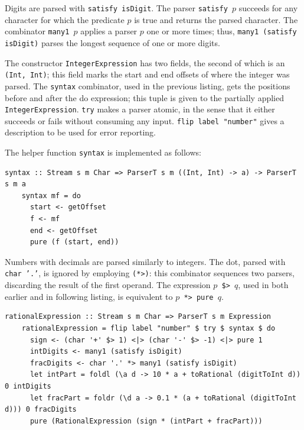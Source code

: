 \documentclass[UdineBachThesis,american,11pt]{PhdThesis}
\begin{document}
  Digits are parsed with \mbox{\texttt{satisfy isDigit}}. The parser
  \mbox{\texttt{satisfy $p$}} succeeds for any character for which the predicate
  $p$ is true and returns the parsed character. The combinator
  \mbox{\texttt{many1 $p$}} applies a parser $p$ one or more times; thus,
  \mbox{\texttt{many1 (satisfy isDigit)}} parses the longest sequence of one or
  more digits.

  The constructor \mbox{\texttt{IntegerExpression}} has two fields, the second
  of which is an \mbox{\texttt{(Int, Int)}}; this field marks the start and end
  offsets of where the integer was parsed. The \mbox{\texttt{syntax}}
  combinator, used in the previous listing, gets the positions before and after
  the do expression; this tuple is given to the partially applied
  \mbox{\texttt{IntegerExpression}}. \mbox{\texttt{try}} makes a parser atomic,
  in the sense that it either succeeds or fails without consuming any input.
  \mbox{\texttt{flip label "number"}} gives a description to be used for error
  reporting.

  The helper function \mbox{\texttt{syntax}} is implemented as follows:

  \begin{Verbatim}[gobble=4,fontsize=\small]
    syntax :: Stream s m Char => ParserT s m ((Int, Int) -> a) -> ParserT s m a
    syntax mf = do
      start <- getOffset
      f <- mf
      end <- getOffset
      pure (f (start, end))
  \end{Verbatim}

  Numbers with decimals are parsed similarly to integers. The dot, parsed with
  \mbox{\texttt{char '.'}}, is ignored by employing \mbox{\texttt{(*>)}}: this
  combinator sequences two parsers, discarding the result of the first operand.
  The expression \texttt{$p$ \$> $q$}, used in both earlier and in following
  listing, is equivalent to \mbox{\texttt{$p$ *> pure $q$}}.

  \begin{Verbatim}[gobble=4,fontsize=\small]
    rationalExpression :: Stream s m Char => ParserT s m Expression
    rationalExpression = flip label "number" $ try $ syntax $ do
      sign <- (char '+' $> 1) <|> (char '-' $> -1) <|> pure 1
      intDigits <- many1 (satisfy isDigit)
      fracDigits <- char '.' *> many1 (satisfy isDigit)
      let intPart = foldl (\a d -> 10 * a + toRational (digitToInt d)) 0 intDigits
      let fracPart = foldr (\d a -> 0.1 * (a + toRational (digitToInt d))) 0 fracDigits
      pure (RationalExpression (sign * (intPart + fracPart)))
  \end{Verbatim}
\end{document}
